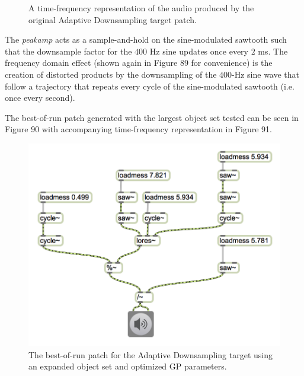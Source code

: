 \documentclass[12pt]{report} 	%
\numberwithin{figure}{chapter}
\numberwithin{table}{chapter}
\numberwithin{equation}{chapter}
\begin{document}
\begin{flushleft}
\begin{figure}[h!]
\begin{center}
\caption[Original adaptive downsampling time-frequency representation]{A time-frequency representation of the audio produced by the original Adaptive Downsampling target patch.}
\end{center}
\vspace{6pt}
\end{figure}
The \textit{peakamp\texttildelow{}} acts as a sample-and-hold on the sine-modulated sawtooth such that the downsample factor for the $400$ Hz sine updates once every $2$ ms. The frequency domain effect (shown again in Figure 89 for convenience) is the creation of distorted products by the downsampling of the $400$-Hz sine wave that follow a trajectory that repeats every cycle of the sine-modulated sawtooth (i.e. once every second).

The best-of-run patch generated with the largest object set tested can be seen in Figure 90 with accompanying time-frequency representation in Figure 91.
\begin{figure}[h!]
\begin{center}
\includegraphics[width=\linewidth]{AdaptiveDownsample_Best}
\caption[Adaptive downsampling best-of-run patch]{The best-of-run patch for the Adaptive Downsampling target using an expanded object set and optimized GP parameters.}
\end{center}
\vspace{6pt}
\end{figure}


\end{flushleft}
\end{document}
